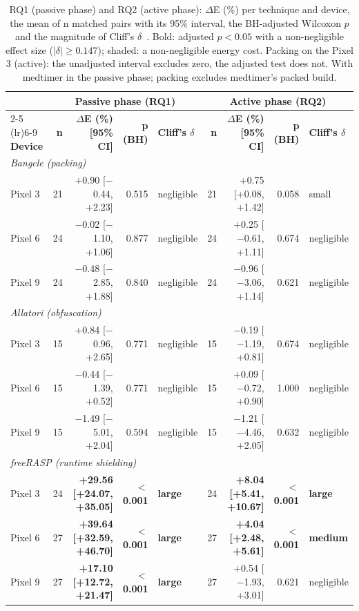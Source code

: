 \begin{table}[t]
\centering
\small
\caption{RQ1 (passive phase) and RQ2 (active phase): $\Delta$E (\%) per technique and device, the mean of n matched pairs with its 95\% interval, the BH-adjusted Wilcoxon $p$ and the magnitude of Cliff's $\delta$~\cite{romano2006cliff}. Bold: adjusted $p < 0.05$ with a non-negligible effect size ($|\delta| \geq 0.147$); shaded: a non-negligible energy cost. Packing on the Pixel 3 (active): the unadjusted interval excludes zero, the adjusted test does not. With medtimer in the passive phase; packing excludes medtimer's packed build.}
\label{tab:rq12-medtimer-in-passive}
\begin{tabular}{lrrrlrrrl}
\toprule
 & \multicolumn{4}{c}{\textbf{Passive phase (RQ1)}} & \multicolumn{4}{c}{\textbf{Active phase (RQ2)}} \\
\cmidrule(lr){2-5} \cmidrule(lr){6-9}
\textbf{Device} & \textbf{n} & \textbf{$\Delta$E (\%) [95\% CI]} & \textbf{p (BH)} & \textbf{Cliff's $\delta$} & \textbf{n} & \textbf{$\Delta$E (\%) [95\% CI]} & \textbf{p (BH)} & \textbf{Cliff's $\delta$} \\
\midrule
\multicolumn{9}{l}{\textit{Bangcle (packing)}} \\
Pixel 3 & 21 & +0.90 [$-$0.44, +2.23] & 0.515 & negligible & 21 & +0.75 [+0.08, +1.42] & 0.058 & small \\
Pixel 6 & 24 & $-$0.02 [$-$1.10, +1.06] & 0.877 & negligible & 24 & +0.25 [$-$0.61, +1.11] & 0.674 & negligible \\
Pixel 9 & 24 & $-$0.48 [$-$2.85, +1.88] & 0.840 & negligible & 24 & $-$0.96 [$-$3.06, +1.14] & 0.621 & negligible \\
\midrule
\multicolumn{9}{l}{\textit{Allatori (obfuscation)}} \\
Pixel 3 & 15 & +0.84 [$-$0.96, +2.65] & 0.771 & negligible & 15 & $-$0.19 [$-$1.19, +0.81] & 0.674 & negligible \\
Pixel 6 & 15 & $-$0.44 [$-$1.39, +0.52] & 0.771 & negligible & 15 & +0.09 [$-$0.72, +0.90] & 1.000 & negligible \\
Pixel 9 & 15 & $-$1.49 [$-$5.01, +2.04] & 0.594 & negligible & 15 & $-$1.21 [$-$4.46, +2.05] & 0.632 & negligible \\
\midrule
\multicolumn{9}{l}{\textit{freeRASP (runtime shielding)}} \\
Pixel 3 & 24 & \cellcolor{red!12}\textbf{+29.56 [+24.07, +35.05]} & \textbf{$<$ 0.001} & \textbf{large} & 24 & \cellcolor{red!12}\textbf{+8.04 [+5.41, +10.67]} & \textbf{$<$ 0.001} & \textbf{large} \\
Pixel 6 & 27 & \cellcolor{red!12}\textbf{+39.64 [+32.59, +46.70]} & \textbf{$<$ 0.001} & \textbf{large} & 27 & \cellcolor{red!12}\textbf{+4.04 [+2.48, +5.61]} & \textbf{$<$ 0.001} & \textbf{medium} \\
Pixel 9 & 27 & \cellcolor{red!12}\textbf{+17.10 [+12.72, +21.47]} & \textbf{$<$ 0.001} & \textbf{large} & 27 & +0.54 [$-$1.93, +3.01] & 0.621 & negligible \\
\bottomrule
\end{tabular}
\end{table}
